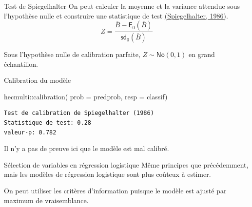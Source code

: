 \documentclass[
  ignorenonframetext,
]{beamer}
\newenvironment{Shaded}{\begin{snugshade}}{\end{snugshade}}
\newcommand{\AttributeTok}[1]{\textcolor[rgb]{0.40,0.45,0.13}{#1}}
\newcommand{\FunctionTok}[1]{\textcolor[rgb]{0.28,0.35,0.67}{#1}}
\newcommand{\NormalTok}[1]{\textcolor[rgb]{0.00,0.23,0.31}{#1}}
\newcommand{\SpecialCharTok}[1]{\textcolor[rgb]{0.37,0.37,0.37}{#1}}
\begin{document}
\begin{frame}{Test de Spiegelhalter}
\protect\hypertarget{test-de-spiegelhalter}{}
On peut calculer la moyenne et la variance attendue sous l'hypothèse
nulle et construire une statistique de test
\href{https://doi.org/10.1002/sim.4780050506}{(Spiegelhalter, 1986)}.
\[Z = \frac{\overline{B} -\mathsf{E}_0(\overline{B})}{\mathsf{sd}_0(\overline{B})}\]

Sous l'hypothèse nulle de calibration parfaite,
\(Z \sim \mathsf{No}(0,1)\) en grand échantillon.
\end{frame}

\begin{frame}[fragile]{Calibration du modèle}
\protect\hypertarget{calibration-du-moduxe8le-1}{}
\begin{Shaded}
\begin{Highlighting}[numbers=left,,]
\NormalTok{hecmulti}\SpecialCharTok{::}\FunctionTok{calibration}\NormalTok{(}
   \AttributeTok{prob =}\NormalTok{ predprob, }
   \AttributeTok{resp =}\NormalTok{ classif)}
\end{Highlighting}
\end{Shaded}

\begin{verbatim}
Test de calibration de Spiegelhalter (1986)
Statistique de test: 0.28 
valeur-p: 0.782
\end{verbatim}

Il n'y a pas de preuve ici que le modèle est mal calibré.
\end{frame}

\begin{frame}{Sélection de variables en régression logistique}
\protect\hypertarget{suxe9lection-de-variables-en-ruxe9gression-logistique}{}
Même principes que précédemment, mais les modèles de régression
logistique sont plus coûteux à estimer.

On peut utiliser les critères d'information puisque le modèle est ajusté
par maximum de vraisemblance.
\end{frame}
\end{document}
